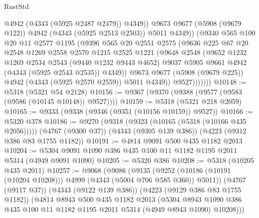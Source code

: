 \begin{lexlean}{RustStd}
\begin{coremodule}
                        @4942
                        (@4343 (@5925 @2487 @2479))
                        @4349))
                    @9673
                    @9677
                    (@5908 (@9679 @122))
                    @4942
                    (@4343 (@5925 @2513 @2503))
                    @5011
                    @4349))
                (@9340
                  @565
                  @100
                  @20
                  @11
                  @2577
                  @1195
                  (@9396
                    @565
                    @20
                    @2551
                    @2575
                    (@9636
                      @225
                      @67
                      @20
                      @2548
                      @1269
                      @2558
                      @2570
                      @1215
                      @2525
                      @1221
                      (@9648
                        @2548
                        (@9652
                          @1232
                          @1269
                          @2534
                          @2543
                          (@9440 @1232 @9443 @4652)
                          @9037
                          @5905
                          @9661
                          @4942
                          (@4343 (@5925 @2543 @2535))
                          @4349))
                      @9673
                      @9677
                      (@5908 (@9679 @225))
                      @4942
                      (@4343 (@5925 @2570 @2559))
                      @5011
                      @4349))
                  @9527)))))))
@10148 := @5318 (@5321 @54 @2128)
@10156 := @9367 (@9370 (@9388 (@9577 (@9583 (@9586 (@10145 @10148)) @9527))))
@10159 := @5318 (@5321 @218 @2059)
@10165 := @9333 (@9338 (@9346 (@9351 (@10156 @10159)) @9527))
@10166 := @5320 @378
@10186 := @9270
    (@9318 (@9323 (@10165 (@5318 (@10166 @435 @2056)))))
    (@4767 (@9300 @37))
    (@4343 (@9305 @139 @386))
    (@4223 (@9312 @386 @83 @1755 @1182))
@10191 := @4814 @9091 @500 @435 @1182 @2013
@10204 := @5304 @9091 @1090 @386 @435 @100 @11 @1182 @1195 @2011 @5314 (@4949 @9091 @1090)
@10205 := @5320 @386
@10208 := @5318 (@10205 @435 @2011)
@10257 := @9068
    (@9086
      (@9135 (@9252 (@10186 (@10191 (@10204 @10208))) @4999 (@4343 (@5004 @706 @585 @360)) @5011))
      (@4767 (@9117 @37))
      (@4343 (@9122 @139 @386))
      (@4223 (@9129 @386 @83 @1755 @1182))
      (@4814
        @8943
        @500
        @435
        @1182
        @2013
        (@5304 @8943 @1090 @386 @435 @100 @11 @1182 @1195 @2011 @5314 (@4949 @8943 @1090) @10208)))

\end{coremodule}
\end{lexlean}
